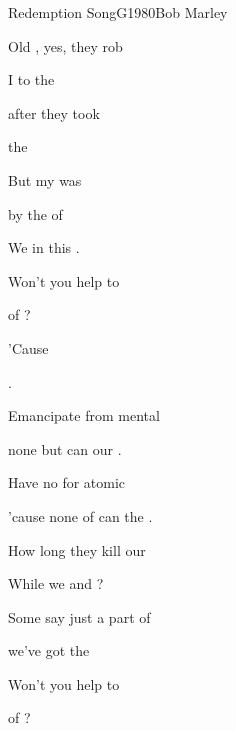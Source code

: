\begin{song}{Redemption Song}{G}{1980}{Bob Marley}{}{}

  \begin{SBVerse}
    Old , yes, they rob 

     I to the  

     after they took 

     the  

    But my  was  

    by the  of  

    We  in this   .
  \end{SBVerse}

  \begin{SBChorus}
    Won't you help to 

      of ?

    'Cause      

         .  
  \end{SBChorus}

  \begin{SBVerse}
    Emancipate  from mental 

    none but  can  our .

    Have no  for atomic 

    'cause none of  can  the .

    How long  they kill our 

    While we   and   ?

    Some say  just a part of 

    we've got   the    
  \end{SBVerse}

  \begin{SBChorus}
    Won't you help to 

      of ?


\end{SBChorus}
\end{song}
